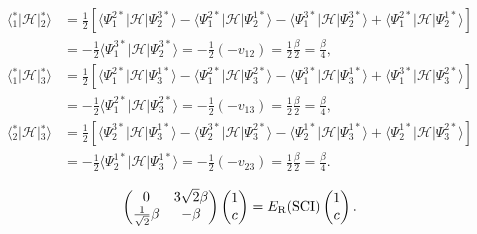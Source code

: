 \documentclass[a4paper]{book}
\newcounter{solution}[chapter]
\begin{document}
	\begin{solution}
	
	\begin{align*}
		\langle {}^*_1 | \mathscr{H} | {}^*_2 \rangle &= \frac{1}{2} \left[ \langle \Psi^{2*}_1 | \mathscr{H} | \Psi^{3*}_2 \rangle - \langle \Psi^{2*}_1 | \mathscr{H} | \Psi^{1*}_2 \rangle - \langle \Psi^{3*}_1 | \mathscr{H} | \Psi^{3*}_2 \rangle + \langle \Psi^{2*}_1 | \mathscr{H} | \Psi^{1*}_2 \rangle \right] \\
		&= - \frac{1}{2} \langle \Psi^{3*}_1 | \mathscr{H} | \Psi^{3*}_2 \rangle = - \frac{1}{2} ( - v_{12} ) = \frac{1}{2} \frac{ \beta }{2} = \frac{ \beta }{4} , \\
		\langle {}^*_1 | \mathscr{H} | {}^*_3 \rangle &= \frac{1}{2} \left[ \langle \Psi^{2*}_1 | \mathscr{H} | \Psi^{1*}_3 \rangle - \langle \Psi^{2*}_1 | \mathscr{H} | \Psi^{2*}_3 \rangle - \langle \Psi^{3*}_1 | \mathscr{H} | \Psi^{1*}_3 \rangle + \langle \Psi^{3*}_1 | \mathscr{H} | \Psi^{2*}_3 \rangle \right] \\
		&= - \frac{1}{2} \langle \Psi^{2*}_1 | \mathscr{H} | \Psi^{2*}_3 \rangle = - \frac{1}{2} ( - v_{13} ) = \frac{1}{2} \frac{ \beta }{2} = \frac{ \beta }{4} , \\
		\langle {}^*_2 | \mathscr{H} | {}^*_3 \rangle &= \frac{1}{2} \left[ \langle \Psi^{3*}_2 | \mathscr{H} | \Psi^{1*}_3 \rangle - \langle \Psi^{3*}_2 | \mathscr{H} | \Psi^{2*}_3 \rangle - \langle \Psi^{1*}_2 | \mathscr{H} | \Psi^{1*}_3 \rangle + \langle \Psi^{1*}_2 | \mathscr{H} | \Psi^{2*}_3 \rangle \right] \\
		&= - \frac{1}{2} \langle \Psi^{1*}_2 | \mathscr{H} | \Psi^{1*}_3 \rangle = - \frac{1}{2} ( - v_{23} ) = \frac{1}{2} \frac{ \beta }{2} = \frac{ \beta }{4}. 
	\end{align*}		
	
	\[
		\begin{pmatrix}
			0 & 3\sqrt{2}\beta \\ \frac{1}{\sqrt{2}} \beta & -\beta 
		\end{pmatrix} \begin{pmatrix}
			1 \\ c
		\end{pmatrix} = E_{\rm R}( {\rm SCI} ) \begin{pmatrix}
			1 \\ c
		\end{pmatrix}.
	\]	
	
	\end{solution}
	
\end{document}
